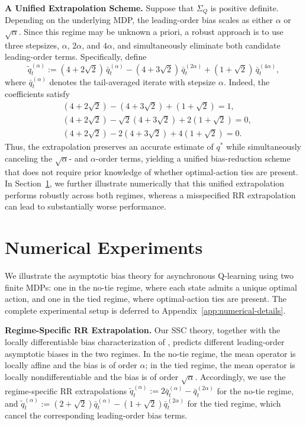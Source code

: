 \documentclass[11pt,letterpaper]{article}
\theoremstyle{plain}
\theoremstyle{definition}
\theoremstyle{remark}
\begin{document}
\noindent\textbf{A Unified Extrapolation Scheme.}
Suppose that \(\Sigma_Q\) is positive definite. Depending on the underlying
MDP, the leading-order bias scales as either \(\alpha\) or
\(\sqrt{\alpha}\). Since this regime may be unknown a priori, a robust
approach is to use three stepsizes, \(\alpha\), \(2\alpha\), and \(4\alpha\),
and simultaneously eliminate both candidate leading-order terms. Specifically, define
\begin{equation}
\label{eq:unified-extrapolation}
    \widetilde q_t^{(\alpha)}
    :=
    (4+2\sqrt{2})\,\bar q_t^{(\alpha)}
    -(4+3\sqrt{2})\,\bar q_t^{(2\alpha)}
    +(1+\sqrt{2})\,\bar q_t^{(4\alpha)},
\end{equation}
where \(\bar q_t^{(\alpha)}\) denotes the tail-averaged iterate with stepsize
\(\alpha\). Indeed, the coefficients satisfy
\[
\begin{aligned}
    &(4+2\sqrt{2})-(4+3\sqrt{2})+(1+\sqrt{2})=1,\\
    &(4+2\sqrt{2})
    -\sqrt{2}(4+3\sqrt{2})
    +2(1+\sqrt{2})=0,\\
    &(4+2\sqrt{2})
    -2(4+3\sqrt{2})
    +4(1+\sqrt{2})=0.
\end{aligned}
\]
Thus, the extrapolation preserves an accurate estimate of \(q^*\) while
simultaneously canceling the \(\sqrt{\alpha}\)- and \(\alpha\)-order terms,
yielding a unified bias-reduction scheme that does not require prior knowledge
of whether optimal-action ties are present. In Section~\ref{sec:experiments},
we further illustrate numerically that this unified extrapolation performs
robustly across both regimes, whereas a misspecified RR extrapolation can
lead to substantially worse performance.

\section{Numerical Experiments}\label{sec:experiments}
We illustrate the asymptotic bias theory for asynchronous Q-learning
using two finite MDPs: one in the no-tie regime, where each state admits a
unique optimal action, and one in the tied regime, where optimal-action ties
are present. The complete experimental setup is deferred to
Appendix~\ref{app:numerical-details}.

\noindent\textbf{Regime-Specific RR Extrapolation.}
Our SSC theory, together with the locally differentiable bias characterization
of \cite{zhang2024constant}, predicts different leading-order asymptotic biases
in the two regimes. In the no-tie regime, the mean operator is locally
affine and the bias is of order \(\alpha\); in the tied regime, the
mean operator is locally nondifferentiable and the bias is of order
\(\sqrt{\alpha}\). Accordingly, we use the regime-specific RR extrapolations $\widetilde q_t^{(\alpha)}
    :=
    2\bar q_t^{(\alpha)}
    -
    \bar q_t^{(2\alpha)}$ for the no-tie regime, and $\widetilde q_t^{(\alpha)}
    :=
    (2+\sqrt{2})\bar q_t^{(\alpha)}
    -
    (1+\sqrt{2})\bar q_t^{(2\alpha)}$ for the tied regime, which cancel the corresponding leading-order bias terms.
\end{document}
